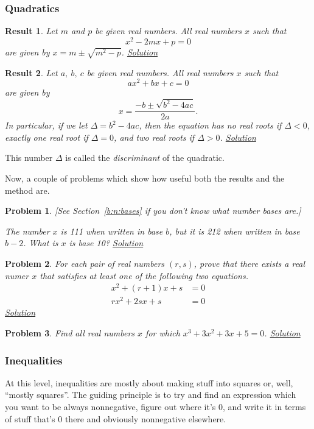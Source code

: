 \documentclass{amsart}
\newtheorem{problem}{Problem}[subsubsection]
\newtheorem{result}{Result}[subsubsection]
\begin{document}
\subsubsection{Quadratics}
\begin{result}\label{r:b:a:quad:1}
  Let $m$ and $p$ be given real numbers. All real numbers $x$ such that
  \[x^2-2mx+p=0\] are given by $x=m\pm\sqrt{m^2-p}$.
  \hyperlink{sr:b:a:quad:1}{Solution}
\end{result}
\begin{result}\label{r:b:a:quad:2}
  Let $a,\ b,\ c$ be given real numbers. All real numbers $x$ such that
  \[ax^2+bx+c=0\] are given by \[x=\frac{-b\pm\sqrt{b^2-4ac}}{2a}.\]
  In particular, if we let $\Delta=b^2-4ac$, then the equation has no real roots
  if $\Delta<0$, exactly one real root if $\Delta=0$, and two real roots if
  $\Delta>0$.
  \hyperlink{sr:b:a:quad:2}{Solution}
\end{result}
This number $\Delta$ is called the \emph{discriminant} of the quadratic.

Now, a couple of problems which show how useful both the results and the method
are.
\begin{problem}\label{p:b:a:quad:1}
  [See Section~\ref{b:n:bases} if you don't know what number bases are.]

  The number $x$ is 111 when written in base $b$, but it is 212 when written in
  base $b-2$. What is $x$ is base 10?
  \hyperlink{sp:b:a:quad:1}{Solution}
\end{problem}
\begin{problem}\label{p:b:a:quad:2}
  For each pair of real numbers $(r,s)$, prove that there exists a real numer
  $x$ that satisfies at least one of the following two equations.
  \begin{align*}
    x^2+(r+1)x+s&=0 \\
    rx^2+2sx+s&=0
  \end{align*}
  \hyperlink{sp:b:a:quad:2}{Solution}
\end{problem}
\begin{problem}\label{p:b:a:quad:3}
  Find all real numbers $x$ for which $x^3+3x^2+3x+5=0$.
  \hyperlink{sp:b:a:quad:3}{Solution}
\end{problem}
\subsubsection{Inequalities}
At this level, inequalities are mostly about making stuff into squares or, well,
``mostly squares''. The guiding principle is to try and find an expression which
you want to be always nonnegative, figure out where it's 0, and write it in
terms of stuff that's 0 there and obviously nonnegative elsewhere.
\end{document}
